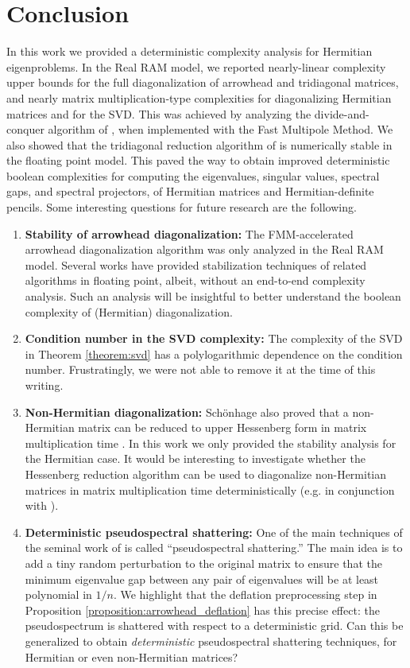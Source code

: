 \documentclass{article}
\begin{document}
\section{Conclusion}
\label{section:conclusion}
In this work we provided a deterministic complexity analysis for Hermitian eigenproblems. In the Real RAM model, we reported nearly-linear complexity upper bounds for the full diagonalization of arrowhead and tridiagonal matrices, and nearly matrix multiplication-type complexities for diagonalizing Hermitian matrices and for the SVD. This was achieved by analyzing the divide-and-conquer algorithm of \cite{gu1995divide}, when implemented with the Fast Multipole Method. We also showed that the tridiagonal reduction algorithm of \cite{schonhage1972unitare} is numerically stable in the floating point model. This paved the way to obtain improved deterministic boolean complexities for computing the eigenvalues, singular values,  spectral gaps, and spectral projectors, of Hermitian matrices and Hermitian-definite pencils.
Some interesting questions for future research are the following.
\begin{enumerate}
    \item \textbf{Stability of arrowhead diagonalization:} The FMM-accelerated arrowhead diagonalization algorithm was only analyzed in the Real RAM model. Several works \cite{gu1995divide,vogel2016superfast,ou2022superdc,cai2020stable} have provided stabilization techniques of related algorithms in floating point, albeit, without an end-to-end complexity analysis. Such an analysis will be insightful to better understand the boolean complexity of (Hermitian) diagonalization. 
    \item \textbf{Condition number in the SVD complexity:} The complexity of the SVD in Theorem \ref{theorem:svd} has a polylogarithmic dependence on the condition number. 
    Frustratingly, we were not able to remove it at the time of this writing.
    \item \textbf{Non-Hermitian diagonalization:} Sch\"onhage also proved that a non-Hermitian matrix can be reduced to upper Hessenberg form in matrix multiplication time \cite{schonhage1972unitare}. In this work we only provided the stability analysis for the Hermitian case. It would be interesting to investigate whether the Hessenberg reduction algorithm can be used to diagonalize non-Hermitian matrices in matrix multiplication time deterministically (e.g. in conjunction with \cite{banks2021global1,banks2022global2,banks2022global3}).
    \item \textbf{Deterministic pseudospectral shattering:} One of the main techniques of the seminal work of \cite{banks2022pseudospectral} is called ``pseudospectral shattering.'' The main idea is to add a tiny random perturbation to the original matrix to ensure that the minimum eigenvalue gap between any pair of eigenvalues will be at least polynomial in $1/n$. We highlight that the deflation preprocessing step in Proposition \ref{proposition:arrowhead_deflation} has this precise effect: the pseudospectrum is shattered with respect to a deterministic grid. Can this be generalized to obtain \textit{deterministic} pseudospectral shattering techniques, for Hermitian or even non-Hermitian matrices?
\end{enumerate}
\end{document}
